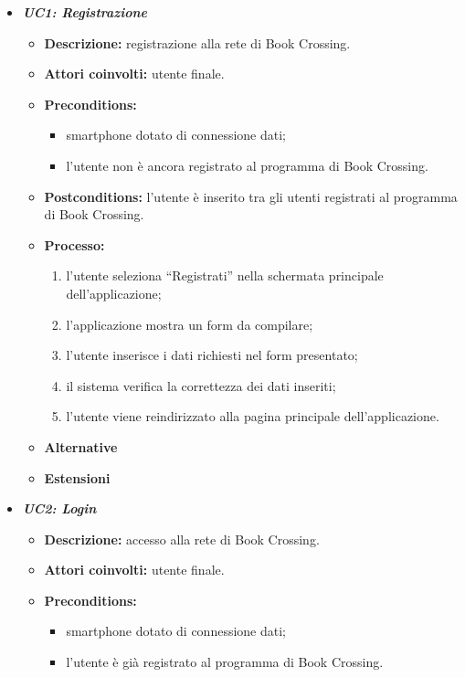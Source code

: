 

\begin{itemize}
	\item \textbf{\textit{UC1: Registrazione}}
	\begin{itemize}
		\item \textbf{Descrizione:} registrazione alla rete di Book Crossing.
		\item \textbf{Attori coinvolti:} utente finale.
		\item \textbf{Preconditions:} 
		\begin{itemize}
			\item smartphone dotato di connessione dati;
			\item l’utente non è ancora registrato al programma di Book Crossing.
		\end{itemize}
		\item \textbf{Postconditions:} l’utente è inserito tra gli utenti registrati al programma di Book Crossing.
		\item \textbf{Processo:}
		\begin{enumerate}
			\item l’utente seleziona “Registrati” nella schermata principale dell’applicazione;
			\item l’applicazione mostra un form da compilare;
			\item l’utente inserisce i dati richiesti nel form presentato;
			\item il sistema verifica la correttezza dei dati inseriti;
			\item l’utente viene reindirizzato alla pagina principale dell’applicazione.
		\end{enumerate}
		\item \textbf{Alternative}
		\item \textbf{Estensioni}
	\end{itemize}
	\item \textbf{\textit{UC2: Login}}
	\begin{itemize}
		\item \textbf{Descrizione:} accesso alla rete di Book Crossing.
		\item \textbf{Attori coinvolti:} utente finale. 
		\item \textbf{Preconditions:} 
		\begin{itemize}
			\item smartphone dotato di connessione dati;
			\item l’utente è già registrato al programma di Book Crossing.
		\end{itemize}

\end{itemize}
\end{itemize}
